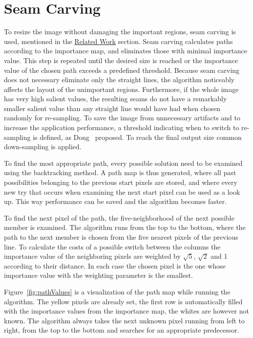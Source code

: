 \documentclass[draft,final]{vutinfth} %
\begin{document}
	\section{Seam Carving}
	To resize the image without damaging the important regions, seam carving is used, mentioned in the \hyperref[seamCarving]{Related Work} section.
	Seam carving calculates paths according to the importance map, and eliminates those with minimal importance value.
	This step is repeated until the desired size is reached or the importance value of the chosen path exceeds a predefined threshold.
	Because seam carving does not necessary eliminate only the straight lines, the algorithm noticeably affects the layout of the unimportant regions.
	Furthermore, if the whole image has very high salient values, the resulting seams do not have a remarkably smaller salient value than any straight line would have had when chosen randomly for re-sampling.
	To save the image from unnecessary artifacts and to increase the application performance, a threshold indicating when to switch to re-sampling is defined, as Dong~\cite{dong2009optimized} proposed.
	To reach the final output size common down-sampling is applied.\par 
	To find the most appropriate path, every possible solution need to be examined using the backtracking method.
	A path map is thus generated, where all past possibilities belonging to the previous start pixels are stored, and where every new try that occurs when examining the next start pixel can be used as a look up.
	This way performance can be saved and the algorithm becomes faster.\par 
	To find the next pixel of the path, the five-neighborhood of the next possible member is examined.
	The algorithm runs from the top to the bottom, where the path to the next member is chosen from the five nearest pixels of the previous line.
	To calculate the costs of a possible switch between the columns the importance value of the neighboring pixels are weighted by $\sqrt{5}$, $\sqrt{2}$ and 1 according to their distance.
	In each case the chosen pixel is the one whose importance value with the weighting parameter is the smallest.\par
	Figure~\ref{fig:pathValues} is a visualization of the path map while running the algorithm.
	The yellow pixels are already set, the first row is automatically filled with the importance values from the importance map, the whites are however not known.
	The algorithm always takes the next unknown pixel running from left to right, from the top to the bottom and searches for an appropriate predecessor.
\end{document}
